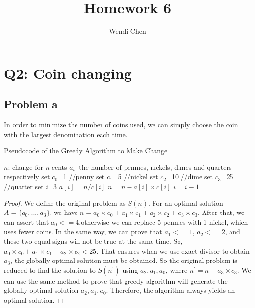 \documentclass[a4paper]{article}
\title{\textbf{Homework 6}}
\author{Wendi Chen}
\date{}
\newtheorem{proof}{Proof}[section]
\begin{document}
\maketitle

\section{Q2: Coin changing}
\subsection{Problem a}
In order to minimize the number of coins used,
 we can simply choose the coin with the largest denomination each time.
\renewcommand{\algorithmicrequire}{\textbf{Input:}}  %
\renewcommand{\algorithmicensure}{\textbf{Output:}} %
\begin{algorithm}[h]
    \caption{Pseudocode of the Greedy Algorithm to Make Change}
    \begin{algorithmic}[1]
        \Require
        $n$: change for $n$ cents
        \Ensure
        $a_i$: the number of pennies, nickels, dimes and quarters respectively
        \State set $c_0$=1 //penny
        \State set $c_1$=5 //nickel
        \State set $c_2$=10 //dime
        \State set $c_3$=25 //quarter
        \State set $i$=3
        \State$a[i] = n/c[i]$
        \State$n = n - a[i]\times c[i]$
        \State$i = i - 1$
        \EndWhile
    \end{algorithmic}
\end{algorithm}
\begin{proof}
    We define the original problem as $S(n)$. For an optimal solution $A=\{a_0,...,a_3\}$, we have $n = a_0\times c_0+a_1\times c_1+a_2\times c_2+a_3\times c_3$. 
    After that, we can assert that $a_0<=4$,otherwise we can replace 5 pennies with 1 nickel, which uses fewer coins. 
    In the same way, we can prove that $a_1<=1$, $a_2<=2$, and these two equal signs will not be true at the same time. 
    So, $a_0\times c_0+a_1\times c_1+a_2\times c_2<25$.
    That ensures when we use exact divisor to obtain $a_3$, the globally optimal solution must be obtained.
    So the original problem is reduced to find the solution to $S(n^{'})$ using $a_2,a_1,a_0$, where $n^{'} = n - a_3\times c_3$.
    We can use the same method to prove that greedy algorithm will generate the globally optimal solution $a_2,a_1,a_0$.
    Therefore, the algorithm always yields an optimal solution.
\end{proof}
\end{document}

